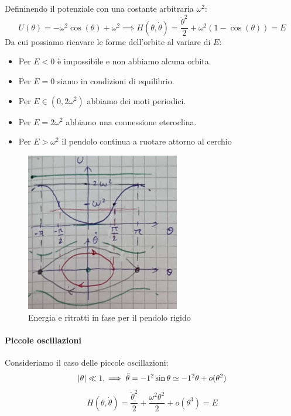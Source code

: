 \begin{example}
    Defininendo il potenziale con una costante arbitraria $\omega^2$:
    \begin{equation}
        U(\theta)= -\omega^2\cos(\theta)+\omega^2 \implies H(\theta,\dot{\theta})= \frac{\dot{\theta}^2}{2}+ \omega^2\left( 1-\cos(\theta) \right)= E 
    \end{equation}
    Da cui possiamo ricavare le forme dell'orbite al variare di $E$:
    \begin{itemize}
        \item Per $E<0$ è impossibile e non abbiamo alcuna orbita.
        \item Per $E=0$ siamo in condizioni di equilibrio.  
        \item Per $E \in (0,2\omega^2)$ abbiamo dei moti periodici.
        \item Per $E = 2\omega^2$ abbiamo una connessione eteroclina.
        \item Per $E > \omega^2$ il pendolo continua a ruotare attorno al cerchio
    \end{itemize}

    \begin{figure}[h]
        \centering
        \includegraphics[width=0.6\textwidth]{images/orbitaPendoloRigido.png}
        \caption{Energia e ritratti in fase per il pendolo rigido}
    \end{figure}

    \paragraph{Piccole oscillazioni}
    Consideriamo il caso delle piccole oscillazioni: 
    \begin{equation*}
        \abs{\theta} \ll 1, \implies \ddot{\theta} = -1^2 \sin \theta \simeq -1^2 \theta + o(\theta^2)
    \end{equation*}
    \begin{equation*}
        H(\theta, \dot{\theta}) = \frac{\dot{\theta}^2}{2} + \frac{\omega^2 \theta^2}{2} + o(\theta^3) = E 
    \end{equation*}


\end{example}

